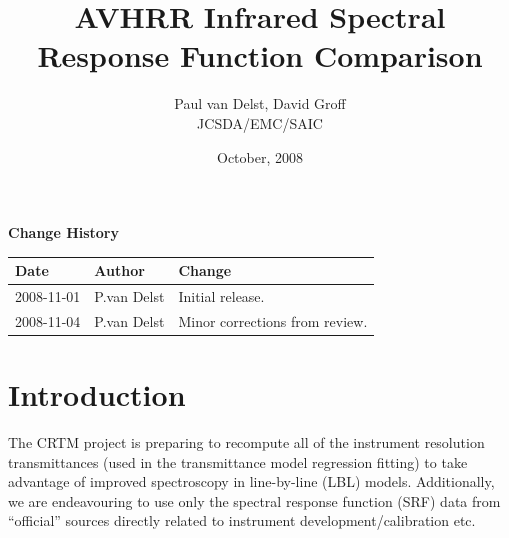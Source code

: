 



\title{AVHRR Infrared Spectral Response Function Comparison}
\author{Paul van Delst, David Groff\\JCSDA/EMC/SAIC}
\date{October, 2008}



\maketitle


\thispagestyle{empty}
\vspace*{10cm}
\begin{center}
  {\sffamily\Large\bfseries Change History}
  \begin{table}[htp]
    \centering
    \begin{tabular}{|p{2cm}|p{3cm}|p{8cm}|}
      \hline
      \sffamily\textbf{Date} & \sffamily\textbf{Author} & \sffamily\textbf{Change}\\
      \hline\hline
      2008-11-01 & P.van Delst & Initial release.\\
      \hline
      2008-11-04 & P.van Delst & Minor corrections from review.\\
      \hline
    \end{tabular}
  \end{table}
\end{center}
\clearpage
{}
\setcounter{page}{1}



\section{Introduction}
The CRTM project is preparing to recompute all of the instrument resolution transmittances (used in the transmittance model regression fitting) to take advantage of improved spectroscopy in line-by-line (LBL) models. Additionally, we are endeavouring to use only the spectral response function (SRF) data from ``official'' sources directly related to instrument development/calibration etc.

